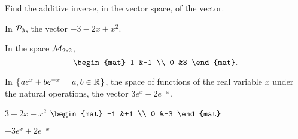
\begin{Exercise}[
name={},
title={}, 
difficulty=0,
origin={\cite{JH}}]
Find the additive inverse, in the vector space, of the vector.

\Question
In \( \mathcal{P}_3 \), the vector \( -3-2x+x^2 \).

\Question
In the space \( \mathcal{M}_{2 \! \times \! 2} \),
        \begin{equation*}
          \begin{mat}
            1  &-1  \\
            0  &3
          \end{mat}.
        \end{equation*}

\Question
In \( \mbox{$\left\{\hspace{0.1em}ae^x+be^{-x}\;\;\middle|\;\; a,b\in\mathbb{R}\hspace{0.1em}\right\}$} \), the space 
       of functions of the real variable \( x \) under the natural operations,
       the vector \( 3e^x-2e^{-x} \).
\end{Exercise}

\begin{Answer}
\Question \( 3+2x-x^2 \)
\Question \( \begin{mat}
                   -1  &+1  \\
                    0  &-3
                 \end{mat} \)

\Question \( -3e^x+2e^{-x} \)
\end{Answer}
